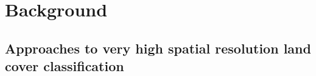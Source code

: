 \section{Background}

\subsection{Approaches to very high spatial resolution land cover classification} 



